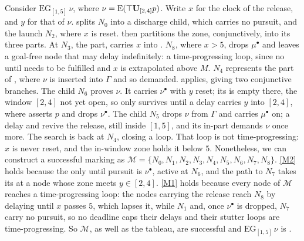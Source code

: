 Consider $\mathrm{EG}_{[1,5]}\,\nu$, where $\nu=\tEU{\top}{p}{[2,4]}$. Write $x$ for the clock of
the release, and $y$ for that of $\nu$.  splits $N_0$ into a discharge child, which
carries no pursuit, and the launch $N_2$, where $x$ is reset.  then partitions the zone,
conjunctively, into its three parts. At $N_3$, the  part,  carries $x$ into  \kI. $N_8$, where $x>5$, drops $\mu^\bullet$ and leaves a goal-free node that
may delay indefinitely: a time-progressing loop, since no until needs to be fulfilled and $x$ is
extrapolated above $M$.
\noindent
$N_4$ represents the  part of , where $\nu$ is inserted into $\Gamma$ and so
demanded.  applies, giving two conjunctive branches. The  child $N_6$
proves $\nu$. It carries $\nu^\bullet$ with $y$ reset; its  is empty there, the window
$[2,4]$ not yet open, so only  survives until a delay carries $y$ into $[2,4]$, where
 asserts $p$ and drops $\nu^\bullet$. The  child $N_5$ drops $\nu$
from $\Gamma$ and carries $\mu^\bullet$ on; a delay and  revive the release, still inside
$[1,5]$, and its in-part demands $\nu$ once more. The search is back at $N_4$, closing a loop. That
loop is not time-progressing: $x$ is never reset, and the in-window zone holds it below $5$.
\noindent
Nonetheless, we can construct a successful marking  as $\mathcal M=\{N_0,\allowbreak N_1,\allowbreak N_2,\allowbreak N_3,\allowbreak N_4,\allowbreak N_5,\allowbreak N_6,\allowbreak N_7,\allowbreak N_8\}$. \ref{M2} holds because the only until pursuit is $\nu^\bullet$, active at $N_6$, and the path to
$N_7$ takes its  at a node whose zone meets $y\in[2,4]$. \ref{M1} holds because every node of
$\mathcal M$ reaches a time-progressing loop: the nodes carrying the release reach $N_8$ by delaying
until $x$ passes $5$, which lapses it, while $N_1$ and, once $\nu^\bullet$ is dropped, $N_7$ carry
no pursuit, so no deadline caps their delays and their stutter loops are time-progressing. So $\mathcal M$, as well as the tableau, are successful and
$\mathrm{EG}_{[1,5]}\,\nu$ is \SAT.
